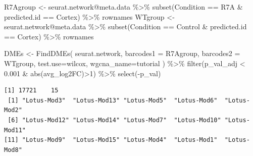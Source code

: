\documentclass[
  letterpaper,
  DIV=11,
  numbers=noendperiod]{scrartcl}
\newenvironment{Shaded}{\begin{snugshade}}{\end{snugshade}}
\newcommand{\AttributeTok}[1]{\textcolor[rgb]{0.40,0.45,0.13}{#1}}
\newcommand{\DecValTok}[1]{\textcolor[rgb]{0.68,0.00,0.00}{#1}}
\newcommand{\FloatTok}[1]{\textcolor[rgb]{0.68,0.00,0.00}{#1}}
\newcommand{\FunctionTok}[1]{\textcolor[rgb]{0.28,0.35,0.67}{#1}}
\newcommand{\NormalTok}[1]{\textcolor[rgb]{0.00,0.23,0.31}{#1}}
\newcommand{\OtherTok}[1]{\textcolor[rgb]{0.00,0.23,0.31}{#1}}
\newcommand{\SpecialCharTok}[1]{\textcolor[rgb]{0.37,0.37,0.37}{#1}}
\newcommand{\StringTok}[1]{\textcolor[rgb]{0.13,0.47,0.30}{#1}}
\begin{document}
\begin{Shaded}
\begin{Highlighting}[]
\NormalTok{R7Agroup }\OtherTok{\textless{}{-}}\NormalTok{ seurat.network}\SpecialCharTok{@}\NormalTok{meta.data }\SpecialCharTok{\%\textgreater{}\%} \FunctionTok{subset}\NormalTok{(Condition }\SpecialCharTok{==} \StringTok{\textquotesingle{}R7A\textquotesingle{}} \SpecialCharTok{\&}\NormalTok{ predicted.id }\SpecialCharTok{==} \StringTok{\textquotesingle{}Cortex\textquotesingle{}}\NormalTok{) }\SpecialCharTok{\%\textgreater{}\%}\NormalTok{ rownames}
\NormalTok{WTgroup }\OtherTok{\textless{}{-}}\NormalTok{ seurat.network}\SpecialCharTok{@}\NormalTok{meta.data }\SpecialCharTok{\%\textgreater{}\%} \FunctionTok{subset}\NormalTok{(Condition }\SpecialCharTok{==} \StringTok{\textquotesingle{}Control\textquotesingle{}} \SpecialCharTok{\&}\NormalTok{ predicted.id }\SpecialCharTok{==} \StringTok{\textquotesingle{}Cortex\textquotesingle{}}\NormalTok{) }\SpecialCharTok{\%\textgreater{}\%}\NormalTok{ rownames}
\end{Highlighting}
\end{Shaded}

\begin{Shaded}
\begin{Highlighting}[]
\NormalTok{DMEs }\OtherTok{\textless{}{-}} \FunctionTok{FindDMEs}\NormalTok{(}
\NormalTok{  seurat.network,}
  \AttributeTok{barcodes1 =}\NormalTok{ R7Agroup,}
  \AttributeTok{barcodes2 =}\NormalTok{ WTgroup,}
  \AttributeTok{test.use=}\StringTok{\textquotesingle{}wilcox\textquotesingle{}}\NormalTok{,}
  \AttributeTok{wgcna\_name=}\StringTok{\textquotesingle{}tutorial\textquotesingle{}}
\NormalTok{) }\SpecialCharTok{\%\textgreater{}\%} \FunctionTok{filter}\NormalTok{(p\_val\_adj }\SpecialCharTok{\textless{}} \FloatTok{0.001} \SpecialCharTok{\&} \FunctionTok{abs}\NormalTok{(avg\_log2FC)}\SpecialCharTok{\textgreater{}}\DecValTok{1}\NormalTok{) }\SpecialCharTok{\%\textgreater{}\%} \FunctionTok{select}\NormalTok{(}\SpecialCharTok{{-}}\NormalTok{p\_val)}
\end{Highlighting}
\end{Shaded}

\begin{verbatim}
[1] 17721    15
 [1] "Lotus-Mod3"  "Lotus-Mod13" "Lotus-Mod5"  "Lotus-Mod6"  "Lotus-Mod2" 
 [6] "Lotus-Mod12" "Lotus-Mod14" "Lotus-Mod7"  "Lotus-Mod10" "Lotus-Mod11"
[11] "Lotus-Mod9"  "Lotus-Mod15" "Lotus-Mod4"  "Lotus-Mod1"  "Lotus-Mod8" 
\end{verbatim}
\end{document}

